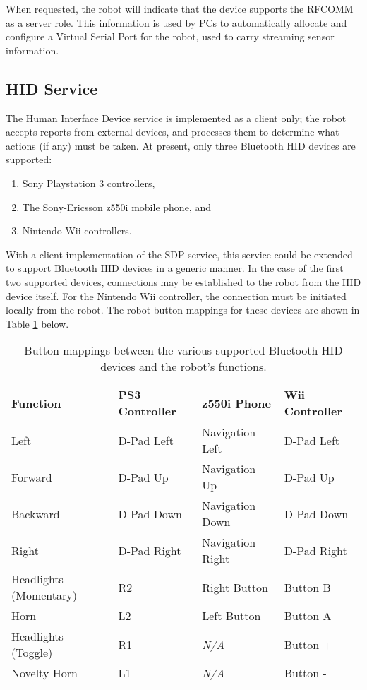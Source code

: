 When requested, the robot will indicate that the device supports the RFCOMM as a server role. This information is used by PCs to automatically allocate and configure a Virtual Serial Port for the robot, used to carry streaming sensor information.

\subsection{HID Service}

The Human Interface Device service is implemented as a client only; the robot accepts reports from external devices, and processes them to determine what actions (if any) must be taken. At present, only three Bluetooth HID devices are supported:

\begin{enumerate}
	\item Sony Playstation 3 controllers,
	\item The Sony-Ericsson z550i mobile phone, and
	\item Nintendo Wii controllers.
\end{enumerate}

With a client implementation of the SDP service, this service could be extended to support Bluetooth HID devices in a generic manner. In the case of the first two supported devices, connections may be established to the robot from the HID device itself. For the Nintendo Wii controller, the connection must be initiated locally from the robot. The robot button mappings for these devices are shown in Table \ref{tab:robotbtbuttonmappings} below.

\begin{table}[H]
	\begin{center}
		\begin{tabular}{ | l | l | l | l | }
			\hline
			\textbf{Function}		& \textbf{PS3 Controller}	& \textbf{z550i Phone}	& \textbf{Wii Controller} \\ \hline

			Left					& D-Pad Left				& Navigation Left		& D-Pad Left	\\ \hline
			Forward					& D-Pad Up					& Navigation Up			& D-Pad Up		\\ \hline
			Backward				& D-Pad Down				& Navigation Down		& D-Pad Down	\\ \hline
			Right					& D-Pad Right				& Navigation Right		& D-Pad Right	\\ \hline
			Headlights (Momentary)	& R2						& Right Button			& Button B		\\ \hline
			Horn					& L2						& Left Button			& Button A		\\ \hline
			Headlights (Toggle)		& R1						& \textit{N/A}			& Button +		\\ \hline
			Novelty Horn			& L1						& \textit{N/A}			& Button -		\\ \hline
		\end{tabular}
		\caption[Bluetooth HID Robot Button Mappings]{Button mappings between the various supported Bluetooth HID devices and the robot's functions.}
		\label{tab:robotbtbuttonmappings}
	\end{center}
\end{table}

